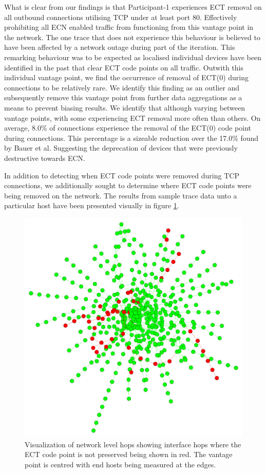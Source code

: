 \documentclass{l4proj}
\begin{document}
What is clear from our findings is that Participant-1 experiences ECT removal on all outbound connections utilising TCP under at least port 80. Effectively prohibiting all ECN enabled traffic from functioning from this vantage point in the network. The one trace that does not experience this behaviour is believed to have been affected by a network outage during part of the iteration. This remarking behaviour was to be expected as localised individual devices have been identified in the past that clear ECT code points on all traffic\cite{bauer_measuring_2011}. Outwith this individual vantage point, we find the occurrence of removal of ECT(0) during connections to be relatively rare. We identify this finding as an outlier and subsequently remove this vantage point from further data aggregations as a means to prevent biasing results. We identify that although varying between vantage points, with some experiencing ECT removal more often than others. On average, 8.0\% of connections experience the removal of the ECT(0) code point during connections. This percentage is a sizeable reduction over the 17.0\% found by Bauer et al\cite{bauer_measuring_2011}. Suggesting the deprecation of devices that were previously destructive towards ECN.

In addition to detecting when ECT code points were removed during TCP connections, we additionally sought to determine where ECT code points were being removed on the network. The results from sample trace data unto a particular host have been presented visually in figure \ref{fig:traces}.

\begin{figure}[H]
    \centering
    \includegraphics[scale=0.1]{dissertation/images/hops.pdf}
    \caption{Visualization of network level hops showing interface hops where the ECT code point is not preserved being shown in red. The vantage point is centred with end hosts being measured at the edges.}
    \label{fig:traces}
\end{figure}
\end{document}
